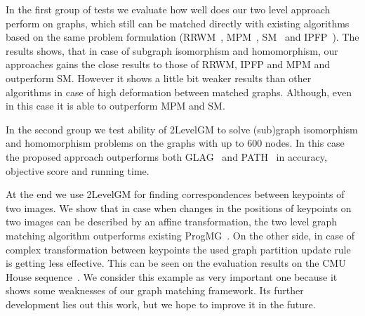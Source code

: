 In the first group of tests we evaluate how well does our two level approach perform on graphs, which still can be matched directly with existing algorithms based on the same problem formulation (RRWM~\cite{Cho2010_RRWM}, MPM~\cite{Cho2014_Haystack}, SM~\cite{Leordeanu2005_SM} and IPFP~\cite{Leordeanu2009_IPFP}). The results shows, that in case of subgraph isomorphism and homomorphism, our approaches gains the close results to those of RRWM, IPFP and MPM and outperform SM. However it shows a little bit weaker results than other algorithms in case of high deformation between matched graphs. Although, even in this case it is able to outperform MPM and SM.

In the second group we test ability of 2LevelGM to solve (sub)graph isomorphism and homomorphism problems on the graphs with up to $600$ nodes. In this case the proposed approach outperforms both GLAG~\cite{Fiori2013_GLAG} and PATH~\cite{Zazlavskiy2008_PATH} in accuracy, objective score and running time.

At the end we use 2LevelGM for finding correspondences between keypoints of two images. We show that in case when changes in the positions of keypoints on two images can be described by an affine transformation, the two level graph matching algorithm outperforms existing ProgMG~\cite{Cho2012_ProgressiveGM}. On the other side, in case of complex transformation between keypoints the used graph partition update rule is getting less effective. This can be seen on the evaluation results on the CMU House sequence~\cite{CMUHouse}. We consider this example as very important one because it shows some weaknesses of our graph matching framework. Its further development lies out this work, but we hope to improve it in the future.

